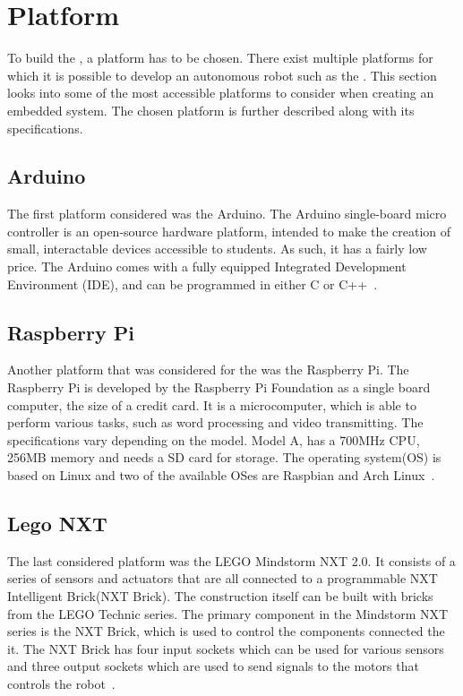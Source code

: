 \section{Platform} \label{sec:platform}
To build the \projname{}, a platform has to be chosen. There exist multiple platforms for which it is possible to develop an autonomous robot such as the \projname{}. This section looks into some of the most accessible platforms to consider when creating an embedded system. The chosen platform is further described along with its specifications.

\subsection{Arduino}
The first platform considered was the Arduino. The Arduino single-board micro controller is an open-source hardware platform, intended to make the creation of small, interactable devices accessible to students. As such, it has a fairly low price. The Arduino comes with a fully equipped Integrated Development Environment (IDE), and can be programmed in either C or C++~\citep{arduino}.

\subsection{Raspberry Pi}
Another platform that was considered for the \projname{} was the Raspberry Pi. The Raspberry Pi is developed by the Raspberry Pi Foundation as a single board computer, the size of a credit card. It is a microcomputer, which is able to perform various tasks, such as word processing and video transmitting. The specifications vary depending on the model. Model A, has a 700MHz CPU, 256MB memory and needs a SD card for storage. The operating system(OS) is based on Linux and two of the available OSes are Raspbian and Arch Linux~\citep{raspberry_pi}. 

\subsection{Lego NXT} \label{sec:lego_nxt}
The last considered platform was the LEGO Mindstorm NXT 2.0. It consists of a series of sensors and actuators that are all connected to a programmable NXT Intelligent Brick(NXT Brick). The construction itself can be built with bricks from the LEGO Technic series. The primary component in the Mindstorm NXT series is the NXT Brick, which is used to control the components connected the it. The NXT Brick has four input sockets which can be used for various sensors and three output sockets which are used to send signals to the motors that controls the robot~\citep{lego_nxt_2.0}.

